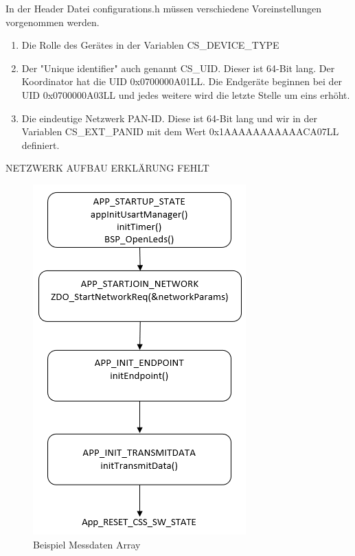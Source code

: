 \documentclass[]{article}
\begin{document}
			In der Header Datei configurations.h müssen verschiedene Voreinstellungen vorgenommen werden. 
			
			\begin{enumerate}
				\item Die Rolle des Gerätes in der Variablen CS\_DEVICE\_TYPE
				\item Der "Unique identifier" auch genannt CS\_UID. Dieser ist 64-Bit lang. Der Koordinator hat die UID 0x0700000A01LL.
				Die Endgeräte beginnen bei der UID 0x0700000A03LL und jedes weitere wird die letzte Stelle um eins erhöht.
				
				\item Die eindeutige Netzwerk PAN-ID. Diese ist 64-Bit lang und wir in der Variablen CS\_EXT\_PANID mit dem Wert 0x1AAAAAAAAAAACA07LL definiert.
			\end{enumerate}
			
			
			NETZWERK AUFBAU ERKLÄRUNG FEHLT
			
			
			\begin{figure}[!h]
				\centering
				\includegraphics[scale=0.60]{images/Netzwerkaufbau}
				\caption{Beispiel Messdaten Array}
				\label{img:Netzwerkaufbau}
			\end{figure}
			
			 
\end{document}
